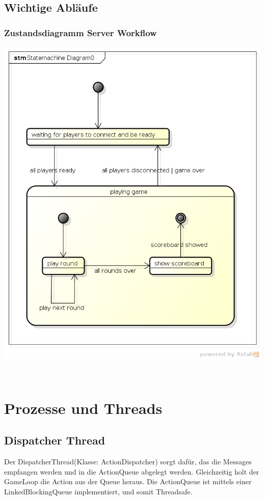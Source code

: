 \documentclass[11pt]{scrartcl}
\begin{document}
\newpage

\subsection{Wichtige Abläufe}
\subsubsection{Zustandsdiagramm Server Workflow}
\includegraphics[scale=0.7]{StatemachineServer}

\newpage
 
\section{Prozesse und Threads}
\subsection{Dispatcher Thread}
Der DispatcherThread(Klasse: ActionDispatcher) sorgt dafür, das die Messages empfangen werden und in die ActionQueue abgelegt werden. Gleichzeitig holt der GameLoop die Action aus der Queue heraus. Die ActionQueue ist mittels einer LinkedBlockingQueue implementiert, und somit Threadsafe.\\
\end{document}
